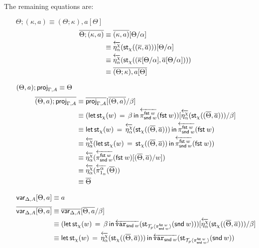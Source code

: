 \documentclass[10pt]{article}
\theoremstyle{definition}
\newcommand\dsd[1]{\ensuremath{\mathsf{#1}}}
\newcommand{\app}[2]{\ensuremath{#1 \: #2}}
\newcommand{\fst}[1]{\app{\dsd{fst}}{#1}}
\newcommand{\snd}[1]{\app{\dsd{snd}}{#1}}
\newcommand{\rewrite}[2]{\overleftarrow{#1}(#2)}
\newcommand\StI[2]{\ensuremath{\mathsf{st}_{#1}(#2)}}
\newcommand\StE[4]{\ensuremath{\mathsf{let} \, \StI{#1}{#3} \, = \, {#2} \, \mathsf{in} \, #4}}
\newcommand\ApEl[2]{\mathcal{T}_{#1}\langle#2\rangle}
\begin{document}
The remaining equations are:

\begin{enumerate}[style = multiline, labelwidth = 80pt]
\item[{$\Theta ; (\kappa , a) \equiv (\Theta ; \kappa) , a[\Theta]$}] 
\begin{align*}
\upstairs{\Theta ; (\kappa , a)}
&\equiv \upstairs{(\kappa, a)}[\Theta/\alpha] \\
&\equiv \rewrite{\eta^\chi_{\alpha}}{\StI{\chi}{(\upstairs{\kappa}, \upstairs{a})}}[\Theta/\alpha] \\
&\equiv \rewrite{\eta^\chi_{\alpha}}{\StI{\chi}{(\upstairs{\kappa}[\Theta/\alpha], \upstairs{a}[\Theta/\alpha])}} \\
&\equiv \upstairs{(\Theta ; \kappa) , a[\Theta]}
\end{align*}
\item[{$(\Theta, a);\mathsf{proj}_{\Gamma,A} \equiv \Theta$}]
\begin{align*}
\upstairs{(\Theta, a);\proj{\Gamma,A}}
&\equiv \upstairs{\proj{\Gamma,A}}[\upstairs{(\Theta, a)}/\beta] \\
&\equiv (\StE{\chi}{\beta}{w}{\rewrite{\pi^{\fst w}_{\snd w}}{\fst w}})[\rewrite{\eta^\chi_{\alpha}}{\StI{\chi}{(\upstairs{\Theta}, \upstairs{a})}}/\beta] \\
&\equiv \StE{\chi}{\rewrite{\eta^\chi_{\alpha}}{\StI{\chi}{(\upstairs{\Theta}, \upstairs{a})}}}{w}{\rewrite{\pi^{\fst w}_{\snd w}}{\fst w}} \\
&\equiv \rewrite{\eta^\chi_{\alpha}}{\StE{\chi}{\StI{\chi}{(\upstairs{\Theta}, \upstairs{a})}}{w}{\rewrite{\pi^{\fst w}_{\snd w}}{\fst w}}} \\
&\equiv \rewrite{\eta^\chi_{\alpha}}{\rewrite{\pi^{\fst w}_{\snd w}}{\fst w}[(\upstairs{\Theta}, \upstairs{a})/w]} \\
&\equiv \rewrite{\eta^\chi_{\alpha}}{\rewrite{\pi^\alpha_{1_\alpha}}{\upstairs{\Theta}}} \\
&\equiv\upstairs{\Theta} 
\end{align*}
\item[{$\mathsf{var}_{\Delta,A}[\Theta, a] \equiv a$}] 
\begin{align*}
\upstairs{\qvar{\Delta,A}[\Theta, a]} 
&\equiv \upstairs{\qvar{\Delta,A}}[\upstairs{\Theta, a}/\beta] \\
&\equiv (\StE{\chi}{\beta}{w}{\rewrite{\var{\snd w}}{\StI{\ApEl{p}{\pi^{\fst w}_{\snd w}}}{\snd w}}})[\rewrite{\eta^\chi_{\alpha}}{\StI{\chi}{(\upstairs{\Theta}, \upstairs{a})}}/\beta] \\
&\equiv \StE{\chi}{\rewrite{\eta^\chi_{\alpha}}{\StI{\chi}{(\upstairs{\Theta}, \upstairs{a})}}}{w}{\rewrite{\var{\snd w}}{\StI{\ApEl{p}{\pi^{\fst w}_{\snd w}}}{\snd w}}} \\

\end{align*}
\end{enumerate}
\end{document}
